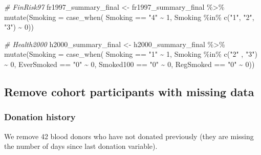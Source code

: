 \documentclass[
]{article}
\newenvironment{Shaded}{\begin{snugshade}}{\end{snugshade}}
\newcommand{\AttributeTok}[1]{\textcolor[rgb]{0.77,0.63,0.00}{#1}}
\newcommand{\CommentTok}[1]{\textcolor[rgb]{0.56,0.35,0.01}{\textit{#1}}}
\newcommand{\DecValTok}[1]{\textcolor[rgb]{0.00,0.00,0.81}{#1}}
\newcommand{\FunctionTok}[1]{\textcolor[rgb]{0.00,0.00,0.00}{#1}}
\newcommand{\NormalTok}[1]{#1}
\newcommand{\OtherTok}[1]{\textcolor[rgb]{0.56,0.35,0.01}{#1}}
\newcommand{\SpecialCharTok}[1]{\textcolor[rgb]{0.00,0.00,0.00}{#1}}
\newcommand{\StringTok}[1]{\textcolor[rgb]{0.31,0.60,0.02}{#1}}
\begin{document}
\begin{Shaded}
\begin{Highlighting}[]
\CommentTok{\# FinRisk97}
\NormalTok{fr1997\_summary\_final }\OtherTok{\textless{}{-}}\NormalTok{ fr1997\_summary\_final }\SpecialCharTok{\%\textgreater{}\%} 
  \FunctionTok{mutate}\NormalTok{(}\AttributeTok{Smoking =} \FunctionTok{case\_when}\NormalTok{(}
\NormalTok{    Smoking }\SpecialCharTok{==} \StringTok{"4"} \SpecialCharTok{\textasciitilde{}} \DecValTok{1}\NormalTok{,}
\NormalTok{    Smoking }\SpecialCharTok{\%in\%} \FunctionTok{c}\NormalTok{(}\StringTok{"1"}\NormalTok{, }\StringTok{"2"}\NormalTok{, }\StringTok{"3"}\NormalTok{) }\SpecialCharTok{\textasciitilde{}} \DecValTok{0}\NormalTok{))}
  
\CommentTok{\# Health2000}
\NormalTok{h2000\_summary\_final }\OtherTok{\textless{}{-}}\NormalTok{ h2000\_summary\_final }\SpecialCharTok{\%\textgreater{}\%} 
  \FunctionTok{mutate}\NormalTok{(}\AttributeTok{Smoking =} \FunctionTok{case\_when}\NormalTok{(}
\NormalTok{            Smoking }\SpecialCharTok{==} \StringTok{"1"} \SpecialCharTok{\textasciitilde{}} \DecValTok{1}\NormalTok{,}
\NormalTok{            Smoking }\SpecialCharTok{\%in\%} \FunctionTok{c}\NormalTok{(}\StringTok{"2"}\NormalTok{ , }\StringTok{"3"}\NormalTok{) }\SpecialCharTok{\textasciitilde{}} \DecValTok{0}\NormalTok{,}
\NormalTok{            EverSmoked }\SpecialCharTok{==} \StringTok{"0"} \SpecialCharTok{\textasciitilde{}} \DecValTok{0}\NormalTok{,}
\NormalTok{            Smoked100 }\SpecialCharTok{==} \StringTok{"0"} \SpecialCharTok{\textasciitilde{}} \DecValTok{0}\NormalTok{,}
\NormalTok{            RegSmoked }\SpecialCharTok{==} \StringTok{"0"} \SpecialCharTok{\textasciitilde{}} \DecValTok{0}\NormalTok{))}
\end{Highlighting}
\end{Shaded}

\hypertarget{remove-cohort-participants-with-missing-data}{%
\subsection{Remove cohort participants with missing
data}\label{remove-cohort-participants-with-missing-data}}

\hypertarget{donation-history}{%
\subsubsection{Donation history}\label{donation-history}}

We remove 42 blood donors who have not donated previously (they are
missing the number of days since last donation variable).
\end{document}
